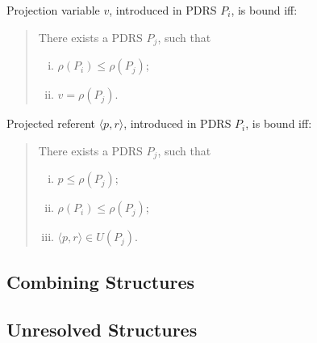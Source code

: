 \begin{definition}
Projection variable $v$, introduced in PDRS $P_i$, is bound iff:
\begin{quote}
There exists a PDRS $P_j$, such that
\begin{enumerate}[i.]
  \item $\rho(P_i) \leq \rho(P_j)$; %
  \item $v = \rho(P_j)$.
\end{enumerate}
\end{quote}
\end{definition}

\begin{definition}
Projected referent $\langle p,r\rangle$, introduced in PDRS $P_i$, is bound iff:
\begin{quote}
There exists a PDRS $P_j$, such that
\begin{enumerate}[i.]
  \item $p \leq \rho(P_j)$; 
  \item $\rho(P_i) \leq \rho(P_j)$; %
  \item $\langle p,r\rangle \in U(P_j)$.
\end{enumerate}
\end{quote}
\end{definition}



\subsection{Combining Structures}

\subsection{Unresolved Structures}
